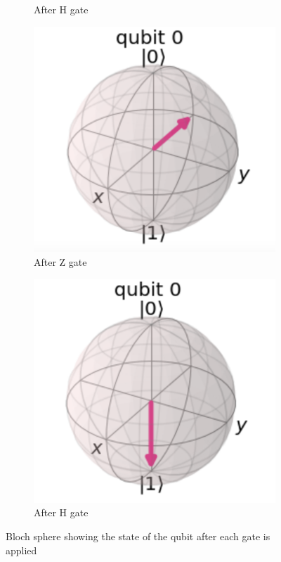 \begin{figure}[h]
\begin{subfigure}[h]{0.24\textwidth}
        \caption{After H gate}
        \label{fig:hzhGate2}
    \end{subfigure}
        \begin{subfigure}[h]{0.24\textwidth}
        \centering
        \includegraphics[width=\textwidth]{lab2/images/hzhGate3.png}
        \caption{After Z gate}
        \label{fig:hzhGate3}
    \end{subfigure}
        \begin{subfigure}[h]{0.24\textwidth}
        \centering
        \includegraphics[width=\textwidth]{lab2/images/hzhGate4.png}
        \caption{After H gate}
        \label{fig:hzhGate4}
    \end{subfigure}
    \captionsetup{font = it, labelfont = bf, width=.91\linewidth, justification=centering}
    \caption{Bloch sphere showing the state of the qubit after each gate is applied} 
    \label{fig:bSphereHZHGate}
\end{figure}


